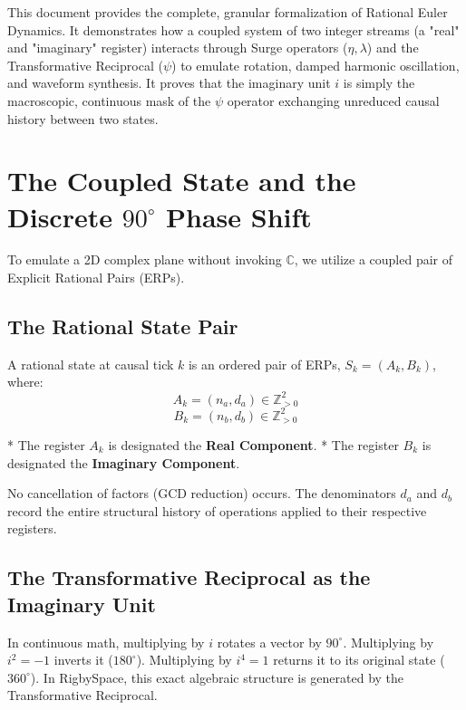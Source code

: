 \documentclass[11pt, letterpaper]{article}
\newcommand{\Z}{\mathbb{Z}}
\newcommand{\aop}{\eta}
\newcommand{\lop}{\lambda}
\newcommand{\psiop}{\psi}
\begin{document}
This document provides the complete, granular formalization of Rational Euler Dynamics. It demonstrates how a coupled system of two integer streams (a "real" and "imaginary" register) interacts through Surge operators ($\aop, \lop$) and the Transformative Reciprocal ($\psiop$) to emulate rotation, damped harmonic oscillation, and waveform synthesis. It proves that the imaginary unit $i$ is simply the macroscopic, continuous mask of the $\psiop$ operator exchanging unreduced causal history between two states.

\section{The Coupled State and the Discrete $90^\circ$ Phase Shift}

To emulate a 2D complex plane without invoking $\mathbb{C}$, we utilize a coupled pair of Explicit Rational Pairs (ERPs).

\subsection{The Rational State Pair}

\begin{rsbox}
\begin{definition}\label{def:state_pair}
A rational state at causal tick $k$ is an ordered pair of ERPs, $S_k = (A_k, B_k)$, where:
\[ A_k = (n_a, d_a) \in \Z_{>0}^2 \]
\[ B_k = (n_b, d_b) \in \Z_{>0}^2 \]

*   The register $A_k$ is designated the \textbf{Real Component}.
*   The register $B_k$ is designated the \textbf{Imaginary Component}.

No cancellation of factors (GCD reduction) occurs. The denominators $d_a$ and $d_b$ record the entire structural history of operations applied to their respective registers.
\end{definition}
\end{rsbox}

\subsection{The Transformative Reciprocal as the Imaginary Unit}

In continuous math, multiplying by $i$ rotates a vector by $90^\circ$. Multiplying by $i^2 = -1$ inverts it ($180^\circ$). Multiplying by $i^4 = 1$ returns it to its original state ($360^\circ$). In RigbySpace, this exact algebraic structure is generated by the Transformative Reciprocal.
\end{document}
